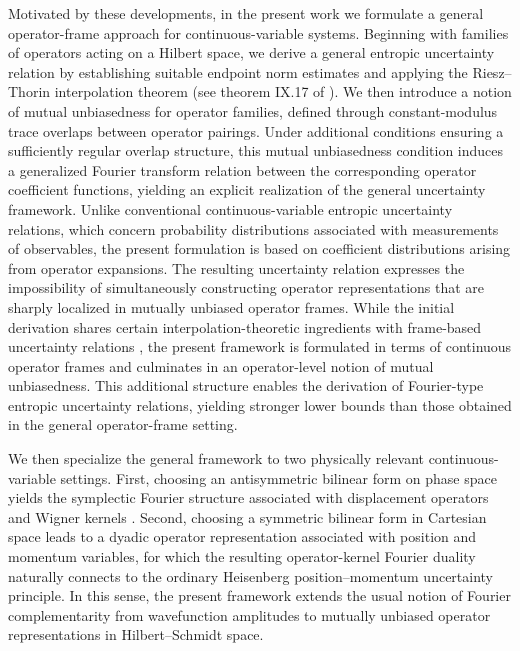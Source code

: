 \documentclass[aps,pra,onecolumn,nofootinbib,superscriptaddress,showpacs]{revtex4}
\begin{document}
Motivated by these developments, in the present work we formulate a general operator-frame approach for continuous-variable systems. Beginning with families of operators acting on a Hilbert space, we derive a general entropic uncertainty relation by establishing suitable endpoint norm estimates and applying the Riesz--Thorin interpolation theorem (see theorem IX.17 of \cite{ReedSimon2}). We then introduce a notion of mutual unbiasedness for operator families, defined through constant-modulus trace overlaps between operator pairings. Under additional conditions ensuring a sufficiently regular overlap structure, this mutual unbiasedness condition induces a generalized Fourier transform relation between the corresponding operator coefficient functions, yielding an explicit realization of the general uncertainty framework. Unlike conventional continuous-variable entropic uncertainty relations, which concern probability distributions associated with measurements of observables, the present formulation is based on coefficient distributions arising from operator expansions. The resulting uncertainty relation expresses the impossibility of simultaneously constructing operator representations that are sharply localized in mutually unbiased operator frames. While the initial derivation shares certain interpolation-theoretic ingredients with frame-based uncertainty relations \cite{Ricaud2013}, the present framework is formulated in terms of continuous operator frames and culminates in an operator-level notion of mutual unbiasedness. This additional structure enables the derivation of Fourier-type entropic uncertainty relations, yielding stronger lower bounds than those obtained in the general operator-frame setting.

We then specialize the general framework to two physically relevant
continuous-variable settings. First, choosing an antisymmetric
bilinear form on phase space yields the symplectic Fourier structure
associated with displacement operators and Wigner kernels \cite{CahillGlauber19691,CahillGlauber19692,Royer1977}. Second, choosing a symmetric bilinear form in Cartesian
space leads to a dyadic operator representation associated
with position and momentum variables, for which the
resulting operator-kernel Fourier duality naturally
connects to the ordinary Heisenberg position--momentum
uncertainty principle.
In this sense, the present framework extends the usual notion of
Fourier complementarity from wavefunction amplitudes to mutually
unbiased operator representations in Hilbert--Schmidt space.
\end{document}
